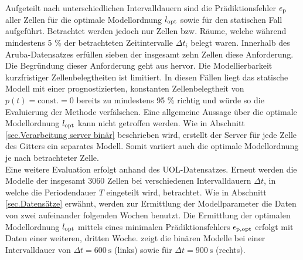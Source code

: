 Aufgeteilt nach unterschiedlichen Intervalldauern sind die Prädiktionsfehler $\epsilon_{\mathrm{p}}$ aller Zellen für die optimale Modellordnung $l_{\mathrm{opt}}$ sowie für den statischen Fall aufgeführt.
Betrachtet werden jedoch nur Zellen bzw. Räume, welche während mindestens 5 \% der betrachteten Zeitintervalle $\Delta t_i$ belegt waren. Innerhalb des Aruba-Datensatzes erfüllen sieben der insgesamt zehn Zellen diese Anforderung. Die Begründung dieser Anforderung geht aus  hervor. Die Modellierbarkeit kurzfristiger Zellenbelegtheiten ist limitiert. In diesen Fällen liegt das statische Modell mit einer prognostizierten, konstanten Zellenbelegtheit von $p(t) = \mathrm{const}. = 0$ bereits zu mindestens 95 \% richtig und würde so die Evaluierung der Methode verfälschen. Eine allgemeine Aussage über die optimale Modellordnung $l_{\mathrm{opt}}$ kann nicht getroffen werden. Wie in Abschnitt \ref{sec.Verarbeitung server binär} beschrieben wird, erstellt der Server für jede Zelle des Gitters ein separates Modell. Somit variiert auch die optimale Modellordnung je nach betrachteter Zelle. \\
Eine weitere Evaluation erfolgt anhand des UOL-Datensatzes. Erneut werden die Modelle der insgesamt 3060 Zellen bei verschiedenen Intervalldauern $\Delta t$, in welche die Periodendauer $T$ eingeteilt wird, betrachtet. Wie in Abschnitt \ref{sec.Datensätze} erwähnt, werden zur Ermittlung der Modellparameter die Daten von zwei aufeinander folgenden Wochen benutzt. Die Ermittlung der optimalen Modellordnung $l_{\mathrm{opt}}$ mittels eines minimalen Prädiktionsfehlers $\epsilon_{\mathrm{p,opt}}$ erfolgt mit Daten einer weiteren, dritten Woche.  zeigt die binären Modelle bei einer Intervalldauer von $\Delta t = \SI{600}{\second} $ (links) sowie für $\Delta t = \SI{900}{\second} $ (rechts). 

